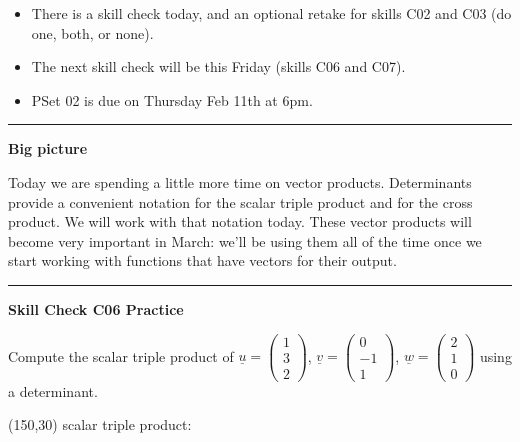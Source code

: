 \documentclass[12pt,letterpaper,noanswers]{exam}
\newcommand{\mb}[1]{\underline{#1}}
\begin{document}
 \pdfpageheight 11in 
  \pdfpagewidth 8.5in





\begin{itemize}
\itemsep0em
    \item There is a skill check today, and an optional retake for skills C02 and C03 (do one, both, or none).
    \item The next skill check will be this Friday (skills C06 and C07).
    \item PSet 02 is due on Thursday Feb 11th at 6pm.
\end{itemize}

\hrule
\vspace{0.2cm}



\noindent\textbf{Big picture}

Today we are spending a little more time on vector products.  Determinants provide a convenient notation for the scalar triple product and for the cross product.  We will work with that notation today.  These vector products will become very important in March: we'll be using them all of the time once we start working with functions that have vectors for their output.

\vspace{0.2cm}
\hrule
\vspace{0.2cm}

\noindent\textbf{Skill Check C06 Practice}

\begin{questions}
\item Compute the scalar triple product of $\mb{u} = \left(\begin{array}{c}1 \\ 3\\ 2\end{array}\right)$, $\mb{v} =\left(\begin{array}{c}0 \\ -1\\ 1\end{array}\right)$, $\mb{w}=\left(\begin{array}{c} 2 \\ 1\\ 0\end{array}\right)$ using a determinant.

\framebox(150,30){ scalar triple product: \hfill }
\end{questions}
\end{document}
